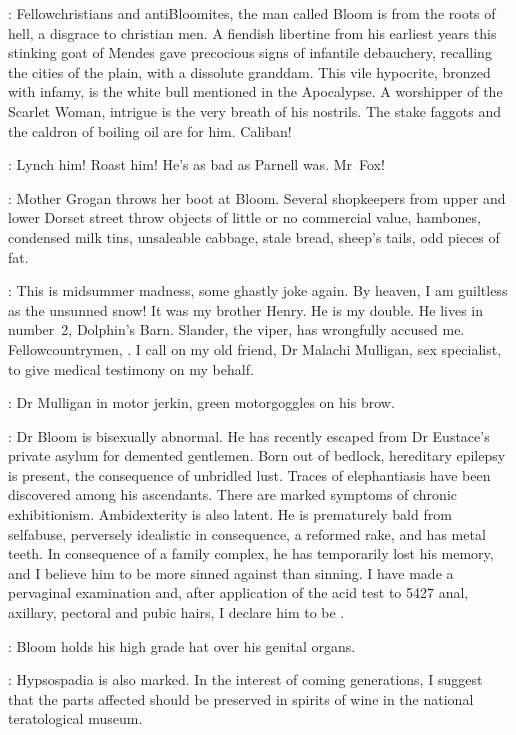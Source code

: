 \Dowie[1]:
Fellowchristians and antiBloomites,
the man called Bloom is from the roots of hell,
a disgrace to christian men.
A fiendish libertine from his earliest years
this stinking goat of Mendes
gave precocious signs of infantile debauchery,
recalling the cities of the plain, with a dissolute granddam.
This vile hypocrite, bronzed with infamy,
is the white bull mentioned in the Apocalypse.
A worshipper of the Scarlet Woman,
intrigue is the very breath of his nostrils.
The stake faggots and the caldron of boiling oil are for him.
Caliban!

\Mob[2]:
Lynch him!
Roast him!
He's as bad as Parnell was.
Mr~Fox!

:
Mother Grogan throws her boot at Bloom.
Several shopkeepers from upper and lower Dorset street
throw objects of little or no commercial value,
hambones, condensed milk tins, unsaleable cabbage, stale bread,
sheep's tails, odd pieces of fat.

\Bloom:
This is midsummer madness, some ghastly joke again.
By heaven, I am guiltless as the unsunned snow!
It was my brother Henry.
He is my double.
He lives in number~2, Dolphin's Barn.
Slander, the viper, has wrongfully accused me.
Fellowcountrymen, .
I call on my old friend, Dr Malachi Mulligan, sex specialist,
to give medical testimony on my behalf.

:
Dr Mulligan in motor jerkin, green motorgoggles on his brow.

\DrMulligan:
Dr Bloom is bisexually abnormal.
He has recently escaped from Dr Eustace's
private asylum for demented gentlemen.
Born out of bedlock, hereditary epilepsy is present,
the consequence of unbridled lust.
Traces of elephantiasis have been discovered among his ascendants.
There are marked symptoms of chronic exhibitionism.
Ambidexterity is also latent.
He is prematurely bald from selfabuse,
perversely idealistic in consequence,
a reformed rake, and has metal teeth.
In consequence of a family complex,
he has temporarily lost his memory,
and I believe him to be more sinned against than sinning.
I have made a pervaginal examination
and, after application of the acid test to
5427 anal, axillary, pectoral and pubic hairs,
I declare him to be .

:
Bloom holds his high grade hat over his genital organs.

\DrMadden[2]:
Hypsospadia is also marked.
In the interest of coming generations,
I suggest that the parts affected should be preserved
in spirits of wine in the national teratological museum.

